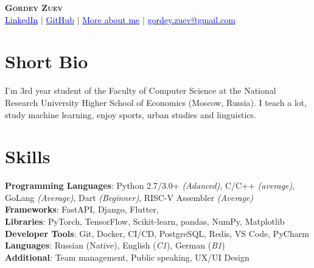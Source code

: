 \documentclass[letterpaper,11pt]{article}
\begin{document}
\begin{center}
    \textsc{\Huge{\textbf{Gordey Zuev}}} \\ \vspace{1pt}
    \href{{https://www.linkedin.com/in/gordey-zuev/}}{\textcolor{blue}{LinkedIn}} $|$
    \href{https://github.com/GordeyZuev}{\textcolor{blue}{GitHub}} $|$
    \href{http://gordeyzuev.notion.site}{\textcolor{blue}{More about me}} $|$
    \href{mailto:gordey.zuev@gmail.com}{\textcolor{blue}{gordey.zuev@gmail.com}}
\end{center}


\section{Short Bio}
 \begin{itemize}[leftmargin=0.15in, label={}]
    \small{\item{
     {I'm 3rd year student of the Faculty of Computer Science at the National Research University Higher School of Economics (Moscow, Russia). I teach a lot, study machine learning, enjoy sports, urban studies and linguistics.}
    }}
 \end{itemize}



\section{Skills}
 \begin{itemize}[leftmargin=0.15in, label={}]
    \small{\item{
     \textbf{Programming Languages}{: Python 2.7/3.0+ \textit{(Adanced)}, C/C++ \textit{(average)}, GoLang \textit{(Average)}, Dart \textit{(Beginner)}, RISC-V Assembler \textit{(Average)}} \\
     \textbf{Frameworks}{: FastAPI, Django, Flutter,} \\
     \textbf{Libraries}{: PyTorch, TensorFlow, Scikit-learn, pandas, NumPy, Matplotlib} \\
     \textbf{Developer Tools}{: Git, Docker, CI/CD, PostgreSQL, Redis, VS Code, PyCharm} \\
     \textbf{Languages}{: Russian (Native), English (\textit{C1}), German (\textit{B1})} \\
     \textbf{Additional}{: Team management, Public speaking, UX/UI Design} \\
    }}
 \end{itemize}
\end{document}

